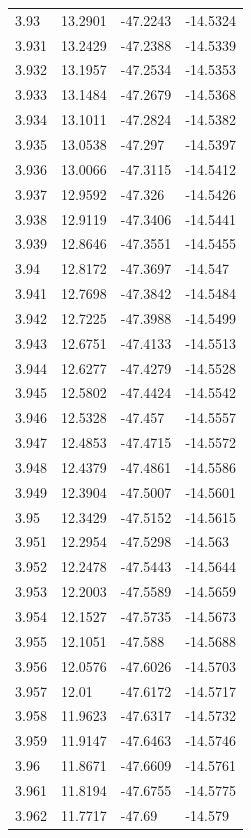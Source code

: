 \begin{tabular}{llll}
3.93 & 13.2901 & -47.2243 & -14.5324 \\
3.931 & 13.2429 & -47.2388 & -14.5339 \\
3.932 & 13.1957 & -47.2534 & -14.5353 \\
3.933 & 13.1484 & -47.2679 & -14.5368 \\
3.934 & 13.1011 & -47.2824 & -14.5382 \\
3.935 & 13.0538 & -47.297 & -14.5397 \\
3.936 & 13.0066 & -47.3115 & -14.5412 \\
3.937 & 12.9592 & -47.326 & -14.5426 \\
3.938 & 12.9119 & -47.3406 & -14.5441 \\
3.939 & 12.8646 & -47.3551 & -14.5455 \\
3.94 & 12.8172 & -47.3697 & -14.547 \\
3.941 & 12.7698 & -47.3842 & -14.5484 \\
3.942 & 12.7225 & -47.3988 & -14.5499 \\
3.943 & 12.6751 & -47.4133 & -14.5513 \\
3.944 & 12.6277 & -47.4279 & -14.5528 \\
3.945 & 12.5802 & -47.4424 & -14.5542 \\
3.946 & 12.5328 & -47.457 & -14.5557 \\
3.947 & 12.4853 & -47.4715 & -14.5572 \\
3.948 & 12.4379 & -47.4861 & -14.5586 \\
3.949 & 12.3904 & -47.5007 & -14.5601 \\
3.95 & 12.3429 & -47.5152 & -14.5615 \\
3.951 & 12.2954 & -47.5298 & -14.563 \\
3.952 & 12.2478 & -47.5443 & -14.5644 \\
3.953 & 12.2003 & -47.5589 & -14.5659 \\
3.954 & 12.1527 & -47.5735 & -14.5673 \\
3.955 & 12.1051 & -47.588 & -14.5688 \\
3.956 & 12.0576 & -47.6026 & -14.5703 \\
3.957 & 12.01 & -47.6172 & -14.5717 \\
3.958 & 11.9623 & -47.6317 & -14.5732 \\
3.959 & 11.9147 & -47.6463 & -14.5746 \\
3.96 & 11.8671 & -47.6609 & -14.5761 \\
3.961 & 11.8194 & -47.6755 & -14.5775 \\
3.962 & 11.7717 & -47.69 & -14.579 \\

\end{tabular}
